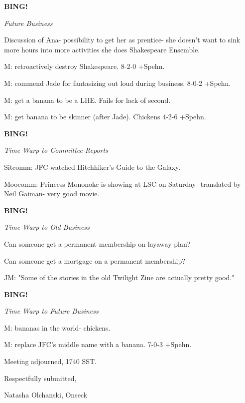\documentclass[12pt]{article}
\newcommand{\bing}{{\bf BING!} }
\newcommand{\goto}[1]{\bing \vskip 12pt \centerline{{\em{#1}}}}
\begin{document}
\goto{Future Business}

Discussion of Ana- possibility to get her as prentice- she doesn't want to sink more hours into more activities she does Shakespeare Ensemble.

M: retroactively destroy Shakespeare. 8-2-0 +Spehn.

M: commend Jade for fantasizing out loud during business. 8-0-2 +Spehn.

M: get a banana to be a LHE. Fails for lack of second.

M: get banana to be skinner (after Jade). Chickens 4-2-6 +Spehn.

\goto{Time Warp to Committee Reports}

Sitcomm: JFC watched Hitchhiker's Guide to the Galaxy.

Moocomm: Princess Mononoke is showing at LSC on Saturday- translated by Neil Gaiman- very good movie.

\goto{Time Warp to Old Business}

Can someone get a permanent membership on layaway plan?

Can someone get a mortgage on a permanent membership?

JM: "Some of the stories in the old Twilight Zine are actually pretty good."

\goto{Time Warp to Future Business}

M: bananas in the world- chickens.

M: replace JFC's middle name with a banana. 7-0-3 +Spehn.

\vspace{12pt}

\noindent
Meeting adjourned, 1740 SST.

\vspace{18pt}

\centerline{Respectfully submitted,}
\centerline{Natasha Olchanski, Onseck}
\end{document}
